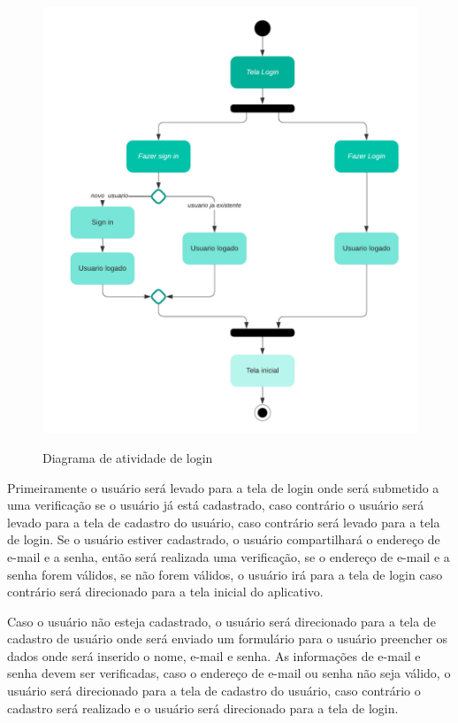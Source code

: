 \begin{figure}[H]
      \begin{center}
            \caption{Diagrama de atividade de login} \label{afp}
            \includegraphics[width=15cm]{Pictures/diagram/atividade.png} \\


      \end{center}
\end{figure}
Primeiramente o usuário será levado para a tela de login onde será submetido a uma verificação se o usuário já está cadastrado, caso contrário o usuário será levado para a tela de cadastro do usuário, caso contrário será levado para a tela de login. Se o usuário estiver cadastrado, o usuário compartilhará o endereço de e-mail e a senha, então será realizada uma verificação, se o endereço de e-mail e a senha forem válidos, se não forem válidos, o usuário irá para a tela de login caso contrário será direcionado para a tela inicial do aplicativo.

Caso o usuário não esteja cadastrado, o usuário será direcionado para a tela de cadastro de usuário onde será enviado um formulário para o usuário preencher os dados onde será inserido o nome, e-mail e senha. As informações de e-mail e senha devem ser verificadas, caso o endereço de e-mail ou senha não seja válido, o usuário será direcionado para a tela de cadastro do usuário, caso contrário o cadastro será realizado e o usuário será direcionado para a tela de login.
